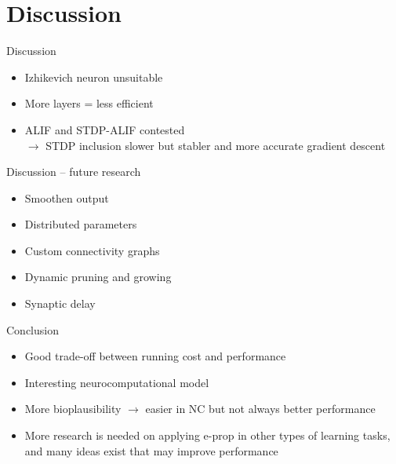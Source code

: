 \documentclass[t]{beamer}
\begin{document}
\section{Discussion}
\begin{frame}{Discussion}
  \begin{itemize}[label=--]
    \item Izhikevich neuron unsuitable
    \item More layers = less efficient
    \item ALIF and STDP-ALIF contested\\$\rightarrow$ STDP inclusion slower but stabler and more accurate gradient descent
  \end{itemize}
\end{frame}

\begin{frame}{Discussion -- future research}
  \begin{itemize}[label=--]
    \item Smoothen output
    \item Distributed parameters
    \item Custom connectivity graphs
    \item Dynamic pruning and growing
    \item Synaptic delay
  \end{itemize}
\end{frame}

\begin{frame}{Conclusion}
  \begin{itemize}[label=--]
    \item Good trade-off between running cost and performance
    \item Interesting neurocomputational model
    \item More bioplausibility $\rightarrow$ easier in NC but not always better performance
    \item More research is needed on applying e-prop in other types of learning tasks, and many ideas exist that may improve performance
  \end{itemize}
\end{frame}
\end{document}
